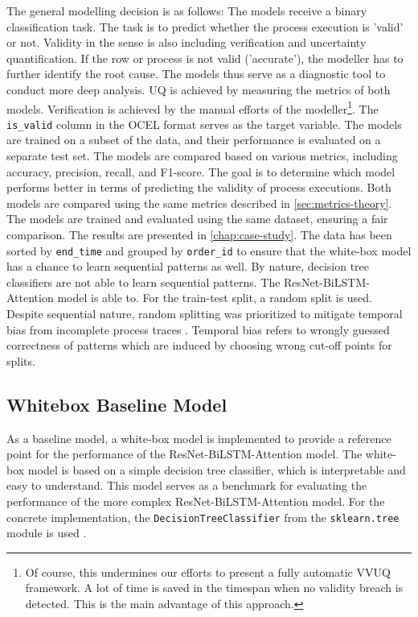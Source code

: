 The general modelling decision is as follows: The models receive a binary classification task. The task is to predict whether the process execution is 'valid' or not. Validity in the sense is also including verification and uncertainty quantification. If the row or process is not valid ('accurate'), the modeller has to further identify the root cause. The models thus serve as a diagnostic tool to conduct more deep analysis. UQ is achieved by measuring the metrics of both models. Verification is achieved by the manual efforts of the modeller\footnote{Of course, this undermines our efforts to present a fully automatic VVUQ framework. A lot of time is saved in the timespan when no validity breach is detected. This is the main advantage of this approach.}. The \texttt{is\_valid} column in the OCEL format serves as the target variable. The models are trained on a subset of the data, and their performance is evaluated on a separate test set. The models are compared based on various metrics, including accuracy, precision, recall, and F1-score. The goal is to determine which model performs better in terms of predicting the validity of process executions. Both models are compared using the same metrics described in \autoref{sec:metrics-theory}. The models are trained and evaluated using the same dataset, ensuring a fair comparison. The results are presented in \autoref{chap:case-study}. The data has been sorted by \texttt{end\_time} and grouped by \texttt{order\_id} to ensure that the white-box model has a chance to learn sequential patterns as well. By nature, decision tree classifiers are not able to learn sequential patterns. The ResNet-BiLSTM-Attention model is able to. For the train-test split, a random split is used. Despite sequential nature, random splitting was prioritized to mitigate temporal bias from incomplete process traces \autocite{morita2022investigation}. Temporal bias refers to wrongly guessed correctness of patterns which are induced by choosing wrong cut-off points for splits.


\subsection{Whitebox Baseline Model}
As a baseline model, a white-box model is implemented to provide a reference point for the performance of the ResNet-BiLSTM-Attention model. The white-box model is based on a simple decision tree classifier, which is interpretable and easy to understand. This model serves as a benchmark for evaluating the performance of the more complex ResNet-BiLSTM-Attention model. For the concrete implementation, the \texttt{DecisionTreeClassifier} from the \texttt{sklearn.tree} module is used \autocite{ScikitLearn}.

